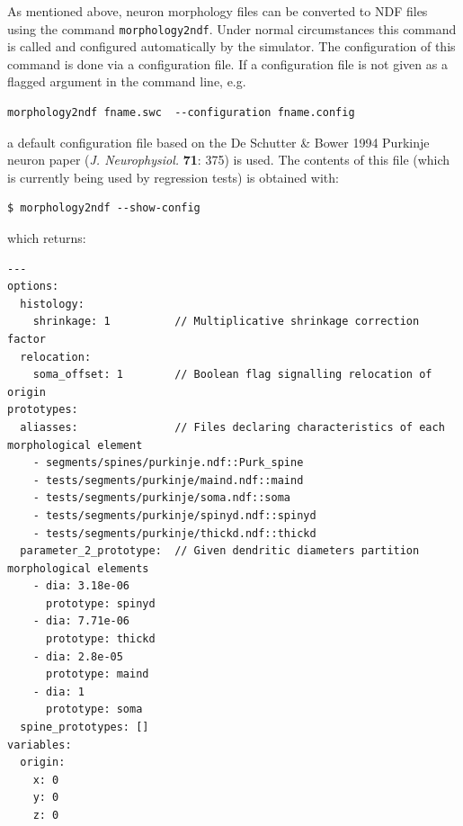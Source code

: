 \documentclass[12pt]{article}
\begin{document}
As mentioned above, neuron morphology files can be converted to NDF
files using the command {\tt morphology2ndf}.  Under normal
circumstances this command is called and configured automatically by
the simulator.  The configuration of this command is done via a
configuration file.  If a configuration file is not given as a flagged
argument in the command line, e.g.

\begin{verbatim}
morphology2ndf fname.swc  --configuration fname.config
\end{verbatim}
a default configuration file based on
the De Schutter \& Bower 1994 Purkinje neuron paper ({\it J.
  Neurophysiol.} {\bf 71}: 375) is used. The contents of this file
(which is currently being used by regression tests) is obtained with:

\begin{verbatim}
$ morphology2ndf --show-config
\end{verbatim}
which returns:

\begin{verbatim}
---
options:
  histology:
    shrinkage: 1          // Multiplicative shrinkage correction factor
  relocation:
    soma_offset: 1        // Boolean flag signalling relocation of origin
prototypes:
  aliasses:               // Files declaring characteristics of each morphological element
    - segments/spines/purkinje.ndf::Purk_spine
    - tests/segments/purkinje/maind.ndf::maind
    - tests/segments/purkinje/soma.ndf::soma
    - tests/segments/purkinje/spinyd.ndf::spinyd
    - tests/segments/purkinje/thickd.ndf::thickd
  parameter_2_prototype:  // Given dendritic diameters partition morphological elements
    - dia: 3.18e-06
      prototype: spinyd
    - dia: 7.71e-06
      prototype: thickd
    - dia: 2.8e-05
      prototype: maind
    - dia: 1
      prototype: soma
  spine_prototypes: []
variables:
  origin:
    x: 0
    y: 0
    z: 0
\end{verbatim}

\end{document}
